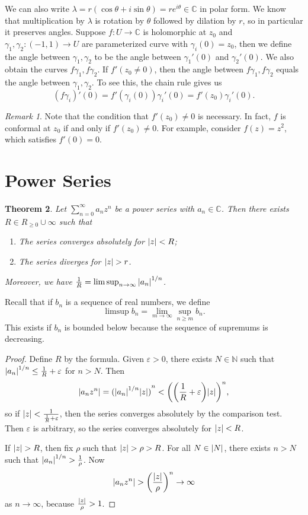\documentclass[leqno, openany]{memoir}
\newtheorem{thm}{Theorem}[section]
\theoremstyle{definition}
\theoremstyle{remark}
\newtheorem{rmk}[thm]{Remark}
\theoremstyle{plain}
\theoremstyle{definition}
\theoremstyle{remark}
\newcommand{\C}{\mathbb{C}}
\newcommand{\N}{\mathbb{N}}
\newcommand{\ep}{\varepsilon}
\begin{document}
We can also write $\lambda = r(\cos \theta + i \sin\theta) = re^{i\theta} \in \C$ in polar form. We know that multiplication by $\lambda$ is rotation by $\theta$ followed by dilation by $r$, so in particular it preserves angles. Suppose $f \colon U \to \C$ is holomorphic at $z_0$ and $\gamma_1, \gamma_2 \colon (-1,1) \to U$ are parameterized curve with $\gamma_i(0) = z_0$, then we define the angle between $\gamma_1, \gamma_2$ to be the angle between $\gamma_1'(0)$ and $\gamma_2'(0)$. We also obtain the curves $f \gamma_1, f \gamma_2$. If $f'(z_0 \neq 0)$, then the angle between $f \gamma_1, f\gamma_2$ equals the angle between $\gamma_1, \gamma_2$. To see this, the chain rule gives us
\[ {(f \gamma_i)}'(0) = f'(\gamma_i(0)) \gamma_i'(0) = f'(z_0) \gamma_i'(0). \]
\begin{rmk}
    Note that the condition that $f'(z_0) \neq 0$ is necessary. In fact, $f$ is conformal at $z_0$ if and only if $f'(z_0) \neq 0$. For example, consider $f(z) = z^2$, which satisfies $f'(0) = 0$.
\end{rmk}

\section{Power Series}%
\label{sec:power_series}

\begin{thm}
    Let $\sum_{n=0}^{\infty} a_n z^n$ be a power series with $a_n \in \C$. Then there exists $R \in R_{\geq 0} \cup \infty$ such that
    \begin{enumerate}
        \item The series converges absolutely for $\abs{z} < R$;
        \item The series diverges for $\abs{z} > r$.
    \end{enumerate}
    Moreover, we have $\frac{1}{R} = \limsup_{n \to \infty} \abs{a_n}^{1/n}$.
\end{thm}

Recall that if $b_n$ is a sequence of real numbers, we define
\[ \limsup b_n = \lim_{m \to \infty} \sup_{n \geq m} b_n. \]
This exists if $b_n$ is bounded below because the sequence of supremums is decreasing.

\begin{proof}
    Define $R$ by the formula. Given $\ep > 0$, there exists $N \in \N$ such that $\abs{a_n}^{1/n} \leq \frac{1}{R} + \ep$ for $n > N$. Then 
    \[ \abs{a_n z^n} = {(\abs{a_n}^{1/n} \abs{z})}^{n} < {\qty( \qty(\frac{1}{R} + \ep) \abs{z} )}^n, \]
    so if $\abs{z} < \frac{1}{\frac{1}{R} + \ep}$, then the series converges absolutely by the comparison test. Then $\ep$ is arbitrary, so the series converges absolutely for $\abs{z} < R$.

    If $\abs{z} > R$, then fix $\rho$ such that $\abs{z} > \rho > R$. For all $N \in \abs{N}$, there exists $n > N$ such that $\abs{a_n}^{1/n} > \frac{1}{\rho}$. Now 
    \[ \abs{a_n z^n} > \qty(\frac{\abs{z}}{\rho})^n \to \infty \]
    as $n \to \infty$, because $\frac{\abs{z}}{\rho} > 1$.
\end{proof}
\end{document}
